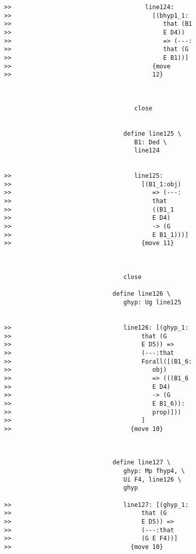 \documentclass[12pt]{article}
\begin{document}
\begin{verbatim}
>>                                     line124:
>>                                       [(bhyp1_1:
>>                                          that (B1
>>                                          E D4))
>>                                          => (---:
>>                                          that (G
>>                                          E B1))]
>>                                       {move
>>                                       12}



                                    close


                                 define line125 \
                                    B1: Ded \
                                    line124


>>                                  line125:
>>                                    [(B1_1:obj)
>>                                       => (---:
>>                                       that
>>                                       ((B1_1
>>                                       E D4)
>>                                       -> (G
>>                                       E B1_1)))]
>>                                    {move 11}



                                 close

                              define line126 \
                                 ghyp: Ug line125


>>                               line126: [(ghyp_1:
>>                                    that (G
>>                                    E D5)) =>
>>                                    (---:that
>>                                    Forall([(B1_6:
>>                                       obj)
>>                                       => (((B1_6
>>                                       E D4)
>>                                       -> (G
>>                                       E B1_6)):
>>                                       prop)]))
>>                                    ]
>>                                 {move 10}



                              define line127 \
                                 ghyp: Mp fhyp4, \
                                 Ui F4, line126 \
                                 ghyp

>>                               line127: [(ghyp_1:
>>                                    that (G
>>                                    E D5)) =>
>>                                    (---:that
>>                                    (G E F4))]
>>                                 {move 10}




\end{verbatim}
\end{document}
